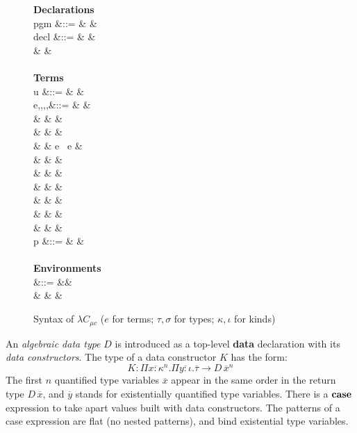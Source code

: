 \begin{figure}[H]
  \small
  \begin{syntax}
    \textbf{Declarations} \\
    pgm &::= &  &  \\
    decl &::= &  &  \\
    & & \quad {} \\ \\
    \textbf{Terms} \\
    u &::= &  &  \\
    e,\tau,\sigma,\kappa,\iota &::= &  &  \\
    & \mid & \star &  \\
    & \mid & \square &  \\
    & \mid & e \ e &  \\
    & \mid &  &  \\
    & \mid &  &  \\
    & \mid &  &  \\
    & \mid &  &  \\
    & \mid &  &  \\
    & \mid &  &  \\
    p &::= &  &  \\ \\
    \textbf{Environments} \\
    \Gamma &::= &\varnothing &  \\
    & \mid &  & 
  \end{syntax}
  \caption{Syntax of $\lambda C_{\mu c}$ ($e$ for terms; $\tau,\sigma$ for types; $\kappa, \iota$ for kinds)}\label{fig:datasyn}
\end{figure}

An \emph{algebraic data type} $D$ is introduced as a top-level
\textbf{data} declaration with its \emph{data constructors}. The type
of a data constructor $K$ has the form:
\[
  K : \Pi\overline{x : \kappa}^{n}.\Pi\overline{y : \iota}.\overline{\tau} \rightarrow D\,\overline{x}^{n}
\]
The first $n$ quantified type variables $\overline{x}$ appear in the
same order in the return type $D\,\overline{x}$, and $\overline{y}$
stands for existentially quantified type variables. There is a $\mathbf{case}$
expression to take apart values built with data constructors. The
patterns of a case expression are flat (no nested patterns), and bind
existential type variables.

